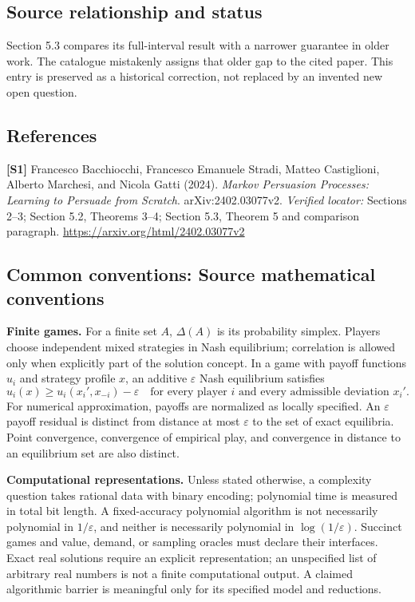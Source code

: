 \documentclass[11pt,a4paper]{article}
\begin{document}
\subsection*{Source relationship and status}
Section 5.3 compares its full-interval result with a narrower guarantee in older work. The catalogue mistakenly assigns that older gap to the cited paper. This entry is preserved as a historical correction, not replaced by an invented new open question.
\subsection*{References}
\begingroup\footnotesize\raggedright
\textbf{[S1]} Francesco Bacchiocchi, Francesco Emanuele Stradi, Matteo Castiglioni, Alberto Marchesi, and Nicola Gatti (2024). \emph{Markov Persuasion Processes: Learning to Persuade from Scratch}. arXiv:2402.03077v2. \textit{Verified locator:} Sections 2--3; Section 5.2, Theorems 3--4; Section 5.3, Theorem 5 and comparison paragraph. \url{https://arxiv.org/html/2402.03077v2}
\par\endgroup

\subsection*{Common conventions: Source mathematical conventions}

\textbf{Finite games.} For a finite set $A$, $\Delta(A)$ is its probability
simplex. Players choose independent mixed strategies in Nash equilibrium;
correlation is allowed only when explicitly part of the solution concept.
In a game with payoff functions $u_i$ and strategy profile $x$, an additive
$\varepsilon$ Nash equilibrium satisfies
\[
 u_i(x)\geq u_i(x_i',x_{-i})-\varepsilon
 \quad\text{for every player $i$ and every admissible deviation $x_i'$}.
\]
For numerical approximation, payoffs are normalized as locally specified.
An $\varepsilon$ payoff residual is distinct from distance at most
$\varepsilon$ to the set of exact equilibria. Point convergence, convergence
of empirical play, and convergence in distance to an equilibrium set are
also distinct.

\textbf{Computational representations.} Unless stated otherwise, a complexity
question takes rational data with binary encoding; polynomial time is measured
in total bit length. A fixed-accuracy polynomial algorithm is not necessarily
polynomial in $1/\varepsilon$, and neither is necessarily polynomial in
$\log(1/\varepsilon)$. Succinct games and value, demand, or sampling oracles
must declare their interfaces. Exact real solutions require an explicit
representation; an unspecified list of arbitrary real numbers is not a
finite computational output. A claimed algorithmic barrier is meaningful
only for its specified model and reductions.
\end{document}
